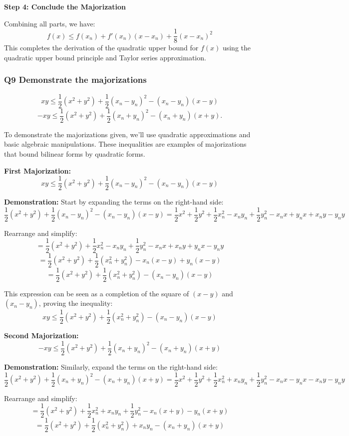 \documentclass[8pt]{article}
\begin{document}
{\textbf{Step 4: Conclude the Majorization}

Combining all parts, we have:
\[
f(x) \leq f(x_n) + f'(x_n)(x - x_n) + \frac{1}{8} (x - x_n)^2
\]
This completes the derivation of the quadratic upper bound for \( f(x) \) using the quadratic upper bound principle and Taylor series approximation.

\subsubsection*{Q9 Demonstrate the majorizations}
\[
xy \leq \frac{1}{2} (x^2 + y^2) + \frac{1}{2} (x_n - y_n)^2 - (x_n - y_n)(x - y)
\]
\[
-xy \leq \frac{1}{2} (x^2 + y^2) + \frac{1}{2} (x_n + y_n)^2 - (x_n + y_n)(x + y).
\]

To demonstrate the majorizations given, we'll use quadratic approximations and basic algebraic manipulations. These inequalities are examples of majorizations that bound bilinear forms by quadratic forms.

\textbf{First Majorization:}
\[
xy \leq \frac{1}{2} (x^2 + y^2) + \frac{1}{2} (x_n - y_n)^2 - (x_n - y_n)(x - y)
\]

\textbf{Demonstration:}
Start by expanding the terms on the right-hand side:
\[
\frac{1}{2} (x^2 + y^2) + \frac{1}{2} (x_n - y_n)^2 - (x_n - y_n)(x - y) = \frac{1}{2} x^2 + \frac{1}{2} y^2 + \frac{1}{2} x_n^2 - x_ny_n + \frac{1}{2} y_n^2 - x_nx + y_nx + x_ny - y_ny
\]

Rearrange and simplify:
\[
= \frac{1}{2} (x^2 + y^2) + \frac{1}{2} x_n^2 - x_ny_n + \frac{1}{2} y_n^2 - x_nx + x_ny + y_nx - y_ny
\]
\[
= \frac{1}{2} (x^2 + y^2) + \frac{1}{2} (x_n^2 + y_n^2) - x_n(x - y) + y_n(x - y)
\]
\[
= \frac{1}{2} (x^2 + y^2) + \frac{1}{2} (x_n^2 + y_n^2) - (x_n - y_n)(x - y)
\]

This expression can be seen as a completion of the square of \( (x - y) \) and \( (x_n - y_n) \), proving the inequality:
\[
xy \leq \frac{1}{2} (x^2 + y^2) + \frac{1}{2} (x_n^2 + y_n^2) - (x_n - y_n)(x - y)
\]

\textbf{Second Majorization:}
\[
-xy \leq \frac{1}{2} (x^2 + y^2) + \frac{1}{2} (x_n + y_n)^2 - (x_n + y_n)(x + y)
\]

\textbf{Demonstration:}
Similarly, expand the terms on the right-hand side:
\[
\frac{1}{2} (x^2 + y^2) + \frac{1}{2} (x_n + y_n)^2 - (x_n + y_n)(x + y) = \frac{1}{2} x^2 + \frac{1}{2} y^2 + \frac{1}{2} x_n^2 + x_ny_n + \frac{1}{2} y_n^2 - x_nx - y_nx - x_ny - y_ny
\]

Rearrange and simplify:
\[
= \frac{1}{2} (x^2 + y^2) + \frac{1}{2} x_n^2 + x_ny_n + \frac{1}{2} y_n^2 - x_n(x + y) - y_n(x + y)
\]
\[
= \frac{1}{2} (x^2 + y^2) + \frac{1}{2} (x_n^2 + y_n^2) + x_ny_n - (x_n + y_n)(x + y)
\]

}
\end{document}
